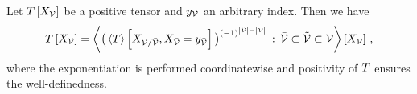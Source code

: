\begin{lemma}
    \label{the:contractionFactorization}
    Let $T\left[X_{\mathcal{V}}\right]$ be a positive tensor and $y_{\mathcal{V}}$ an arbitrary index.
    Then we have
    \begin{align*}
        T\left[X_{\mathcal{V}}\right]
        = \left\langle 
            \big(\left\langle T\right\rangle \left[ X_{\mathcal{V}/\bar{\mathcal{V}}}, X_{\bar{\mathcal{V}}} = y_{\bar{\mathcal{V}}} \right]\big)^{(-1)^{\left|\tilde{\mathcal{V}}\right|-\left|\bar{\mathcal{V}}\right|}} \, : \, \bar{\mathcal{V}} \subset \tilde{\mathcal{V}} \subset \mathcal{V}
        \right\rangle \left[ X_{\mathcal{V}} \right] \, ,
    \end{align*}
    where the exponentiation is performed coordinatewise and positivity of $T$ ensures the well-definedness.
\end{lemma}
